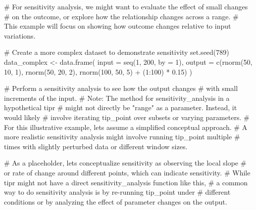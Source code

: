\documentclass[
  10pt,
  letterpaper,
  DIV=11,
  numbers=noendperiod]{scrartcl}
\newenvironment{Shaded}{\begin{snugshade}}{\end{snugshade}}
\newcommand{\AttributeTok}[1]{\textcolor[rgb]{0.40,0.45,0.13}{#1}}
\newcommand{\CommentTok}[1]{\textcolor[rgb]{0.37,0.37,0.37}{#1}}
\newcommand{\DecValTok}[1]{\textcolor[rgb]{0.68,0.00,0.00}{#1}}
\newcommand{\FloatTok}[1]{\textcolor[rgb]{0.68,0.00,0.00}{#1}}
\newcommand{\FunctionTok}[1]{\textcolor[rgb]{0.28,0.35,0.67}{#1}}
\newcommand{\NormalTok}[1]{\textcolor[rgb]{0.00,0.23,0.31}{#1}}
\newcommand{\OtherTok}[1]{\textcolor[rgb]{0.00,0.23,0.31}{#1}}
\newcommand{\SpecialCharTok}[1]{\textcolor[rgb]{0.37,0.37,0.37}{#1}}
\begin{document}
\begin{Shaded}
\begin{Highlighting}[]
\CommentTok{\# For sensitivity analysis, we might want to evaluate the effect of small changes}
\CommentTok{\# on the outcome, or explore how the relationship changes across a range.}
\CommentTok{\# This example will focus on showing how outcome changes relative to input variations.}

\CommentTok{\# Create a more complex dataset to demonstrate sensitivity}
\FunctionTok{set.seed}\NormalTok{(}\DecValTok{789}\NormalTok{)}
\NormalTok{data\_complex }\OtherTok{\textless{}{-}} \FunctionTok{data.frame}\NormalTok{(}
  \AttributeTok{input =} \FunctionTok{seq}\NormalTok{(}\DecValTok{1}\NormalTok{, }\DecValTok{200}\NormalTok{, }\AttributeTok{by =} \DecValTok{1}\NormalTok{),}
  \AttributeTok{output =} \FunctionTok{c}\NormalTok{(}\FunctionTok{rnorm}\NormalTok{(}\DecValTok{50}\NormalTok{, }\DecValTok{10}\NormalTok{, }\DecValTok{1}\NormalTok{), }\FunctionTok{rnorm}\NormalTok{(}\DecValTok{50}\NormalTok{, }\DecValTok{20}\NormalTok{, }\DecValTok{2}\NormalTok{), }\FunctionTok{rnorm}\NormalTok{(}\DecValTok{100}\NormalTok{, }\DecValTok{50}\NormalTok{, }\DecValTok{5}\NormalTok{) }\SpecialCharTok{+}\NormalTok{ (}\DecValTok{1}\SpecialCharTok{:}\DecValTok{100}\NormalTok{) }\SpecialCharTok{*} \FloatTok{0.15}\NormalTok{)}
\NormalTok{)}

\CommentTok{\# Perform a sensitivity analysis to see how the output changes}
\CommentTok{\# with small increments of the input.}
\CommentTok{\# Note: The \textquotesingle{}method\textquotesingle{} for sensitivity\_analysis in a hypothetical \textquotesingle{}tipr\textquotesingle{}}
\CommentTok{\# might not directly be "range" as a parameter. Instead, it would likely}
\CommentTok{\# involve iterating tip\_point over subsets or varying parameters.}
\CommentTok{\# For this illustrative example, let\textquotesingle{}s assume a simplified conceptual approach.}
\CommentTok{\# A more realistic sensitivity analysis might involve running tip\_point multiple}
\CommentTok{\# times with slightly perturbed data or different window sizes.}

\CommentTok{\# As a placeholder, let\textquotesingle{}s conceptualize sensitivity as observing the \textquotesingle{}local slope\textquotesingle{}}
\CommentTok{\# or \textquotesingle{}rate of change\textquotesingle{} around different points, which can indicate sensitivity.}
\CommentTok{\# While \textquotesingle{}tipr\textquotesingle{} might not have a direct \textquotesingle{}sensitivity\_analysis\textquotesingle{} function like this,}
\CommentTok{\# a common way to do sensitivity analysis is by re{-}running \textquotesingle{}tip\_point\textquotesingle{} under}
\CommentTok{\# different conditions or by analyzing the effect of parameter changes on the output.}


\end{Highlighting}
\end{Shaded}
\end{document}
